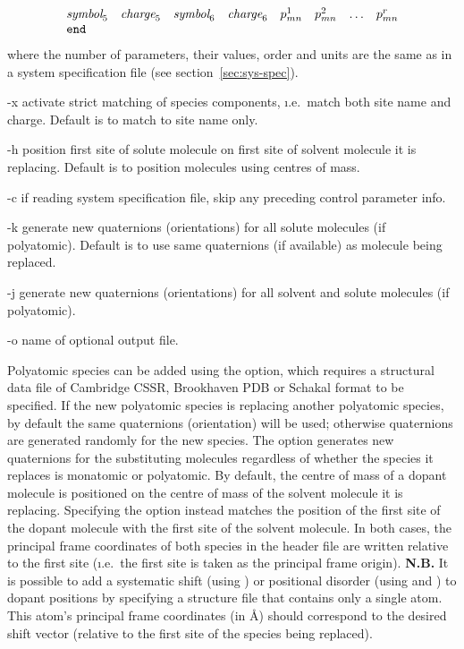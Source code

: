 \documentclass[a4paper,twoside]{report}
\begin{document}
\begin{Argdescription}
\begin{displaymath}
\begin{array}{llllllll}
\textit{symbol}_5 & \textit{charge}_5 & \textit{symbol}_6 & \textit{charge}_6
 & p^{1}_{mn} & p^{2}_{mn} & \ldots & p^{r}_{mn}  \\
\texttt{end} \\
\end{array}
\end{displaymath}
where the number of parameters, their values, order and units are the
same as in a system specification file (see section~\ref{sec:sys-spec}).
\item[-x] activate strict matching of species components, \i.e.\, match both site name and charge.
  Default is to match to site name only.
\item[-h] position first site of solute molecule on first site of solvent molecule it is replacing.
  Default is to position molecules using centres of mass.
\item[-c] if reading system specification file, skip any preceding
  control parameter info.
\item[-k] generate new quaternions (orientations) for all solute molecules (if polyatomic). Default is to use same quaternions (if available)
as molecule being replaced.
\item[-j] generate new quaternions (orientations) for all solvent and solute molecules (if polyatomic).
\item[-o] name of optional output file.
\end{Argdescription}

Polyatomic species can be added using the  option, which requires a structural data file
of Cambridge CSSR, Brookhaven PDB or Schakal format to be specified. If the new polyatomic
species is replacing another polyatomic species, by default the same quaternions (orientation) will be used;
 otherwise quaternions are generated randomly for the new species. The  option generates
new quaternions for the substituting molecules regardless of whether the species it replaces is
monatomic or polyatomic.
By default, the centre of mass of a dopant molecule is positioned on the centre of mass of the solvent molecule it
is replacing. Specifying the  option instead matches the position of the first site of the dopant molecule with
the first site of the solvent molecule. In both cases, the principal frame coordinates of both species in the
header file are written relative to the first site (\i.e.\ the first site is taken as the principal frame origin). \textbf{N.B.} It
is possible to add a systematic shift (using ) or positional disorder (using  and ) to dopant positions 
by specifying a structure file that contains only a single atom. This atom's
principal frame coordinates (in {\AA}) should correspond to the desired shift vector (relative to the first site 
of the species being
replaced).
\end{document}
